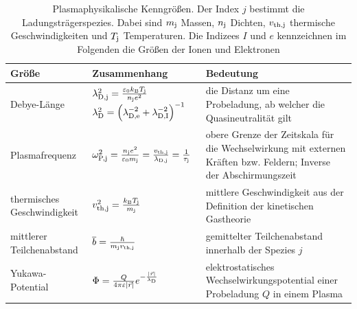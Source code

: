       \begin{table}[H]
        \centering
          \begin{tabular}{m{}|m{}|m{}}
            Größe & Zusammenhang & Bedeutung \\ 
            \hline  Debye-Länge & $\lambda_\text{D,j}^2=\frac{\varepsilon_\text{0}k_\text{B}T_\text{j}}{n_\text{j}e^2}$
            \newline
            $\lambda_\text{D}^2=\left(\lambda_\text{D,e}^{-2}+\lambda_\text{D,I}^{-2}\right)^{-1}$ & die Distanz um eine Probeladung, ab welcher die Quasineutralität gilt\\ 

            \hline Plasmafrequenz & $\omega_\text{P,j}^2=\frac{n_\text{j}e^2}{\varepsilon_\text{0}m_\text{j}}=\frac{v_\text{th,j}}{\lambda_\text{D,j}}=\frac{1}{\tau_\text{j}}$ & obere Grenze der Zeitskala für die Wechselwirkung mit externen Kräften bzw. Feldern; Inverse der Abschirmungszeit \\ 

            \hline thermisches Geschwindigkeit & $v_\text{th,j}^2=\frac{k_\text{B}T_\text{j}}{m_\text{j}}$ & mittlere Geschwindigkeit aus der Definition der kinetischen Gastheorie \\ 

            \hline mittlerer Teilchenabstand & $\overline{b}=\frac{\hbar}{m_\text{j}v_\text{th,j}}$ & gemittelter Teilchenabstand innerhalb der Spezies $j$ \\ 

            \hline Yukawa-Potential & $\Phi=\frac{Q}{4\pi\varepsilon|\vec{r}|}\mathnormal{e}^{-\frac{|\vec{r}|}{\lambda_\text{D}}}$ & elektrostatisches Wechselwirkungspotential einer Probeladung $Q$ in einem Plasma \\

            \hline

          \end{tabular}
        \caption{Plasmaphysikalische Kenngrößen. Der Index $j$ bestimmt die Ladungsträgerspezies. Dabei sind $m_\text{j}$ Massen, $n_\text{j}$ Dichten, $v_\text{th,j}$ thermische Geschwindigkeiten und $T_\text{j}$ Temperaturen. Die Indizees $I$ und $e$ kennzeichnen im Folgenden die Größen der Ionen und Elektronen}
        \label{tab:kenngroessen}
      \end{table}

